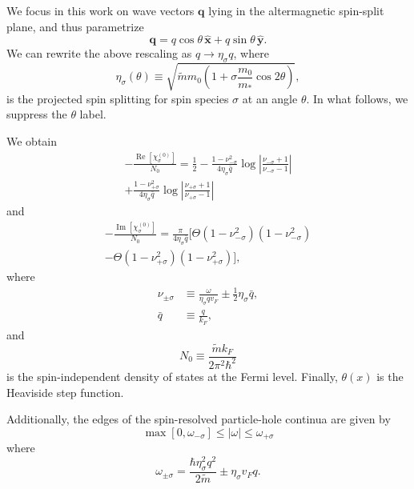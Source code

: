 \documentclass[aps,prb,reprint,twocolumns,superscriptaddress,nofootinbib]{revtex4-2}
\DeclareMathOperator{\Imm}{Im}
\DeclareMathOperator{\Ree}{Re}
\newcommand{\mdos}{\tilde{m}}
\newcommand{\kF}{k_{F}}
\begin{document}
	
	We focus in this work on wave vectors $\bm q$ lying in the altermagnetic spin-split plane, and thus parametrize
	\begin{equation}
		\bm q = q\cos\theta\,\hat{\bm x} + q\sin\theta\,\hat{\bm y}.
	\end{equation}
	We can  rewrite the above rescaling as $q\rightarrow \eta_\sigma q$, where
	\begin{equation}
		\eta_{\sigma}(\theta) \equiv \sqrt{\mdos m_0\left( 1+\sigma \frac{m_0}{m_*}\cos2\theta\right)} \label{eq:sigma},
	\end{equation}
	is the projected spin splitting for spin species $\sigma$ at an angle $\theta$. In what follows, we suppress the $\theta$ label.
	
	We obtain
	\begin{multline}
		-\frac{\Ree[\chi_\sigma^{(0)}]}{N_0} = \frac{1}{2}-\frac{1-\nu_{-\sigma}^2}{4\eta_\sigma \bar q}\log\left|\frac{\nu_{-\sigma}+1}{\nu_{-\sigma}-1}\right|\\+\frac{1-\nu_{+\sigma}^2}{4\eta_\sigma \bar q}\log\left|\frac{\nu_{+\sigma}+1}{\nu_{+\sigma}-1}\right| \label{eq:rechi0}
	\end{multline}
	and
	\begin{multline}
		-\frac{\Imm[\chi_\sigma^{(0)}]}{N_0} = \frac{\pi }{4\eta_\sigma \bar q}\Bigr[\Theta(1-\nu_{-\sigma}^2)(1-\nu_{-\sigma}^2)\\
		-\Theta(1-\nu_{+\sigma}^2)(1-\nu_{+\sigma}^2)\Bigr], \label{eq:imchi0}
	\end{multline}
	where 
	\begin{align}
		\nu_{\pm\sigma} &\equiv \frac{\omega}{\eta_\sigma qv_F} \pm \frac{1}{2}\eta_\sigma \bar q, \\
		\bar q &\equiv \frac{q}{\kF},	\end{align}
	and 
	\begin{equation}
		N_0 \equiv \frac{\mdos \kF}{2\pi^2\hbar^2}
	\end{equation}
	is the spin-independent density of states at the Fermi level. Finally, $\theta(x)$ is the Heaviside step function.
	
	Additionally, the edges of the spin-resolved particle-hole continua are given by 
	\begin{equation}
		\max[0,\omega_{-\sigma}] \leq |\omega| \leq \omega_{+\sigma} \label{eq:boundaries}
	\end{equation}
	where 
	\begin{equation}
		\omega_{\pm\sigma} = \frac{\hbar \eta_\sigma^2q^2}{2\mdos} \pm \eta_\sigma v_F q.\label{eq:omegapm}
	\end{equation}
	
\end{document}
